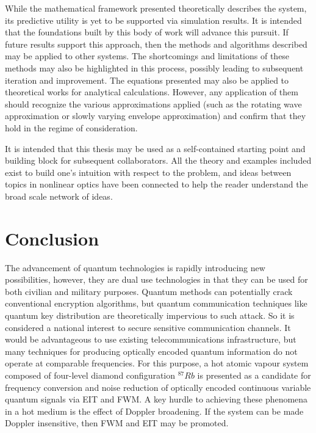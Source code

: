 \documentclass[aps,pra,showpacs,amsmath,amssymb,nofootinbib,longbibliography,superscriptaddress
]{revtex4-1}
\theoremstyle{definition}
\theoremstyle{remark}
\newcommand{\0}{\hat{0}}
\begin{document}
While the mathematical framework presented theoretically describes the system, its predictive utility is yet to be supported via simulation results. It is intended that the foundations built by this body of work will advance this pursuit. If future results support this approach, then the methods and algorithms described may be applied to other systems. The shortcomings and limitations of these methods may also be highlighted in this process, possibly leading to subsequent iteration and improvement. The equations presented may also be applied to theoretical works for analytical calculations. However, any application of them should recognize the various approximations applied (such as the rotating wave approximation or slowly varying envelope approximation) and confirm that they hold in the regime of consideration.

It is intended that this thesis may be used as a self-contained starting point and building block for subsequent collaborators. All the theory and examples included exist to build one's intuition with respect to the problem, and ideas between topics in nonlinear optics have been connected to help the reader understand the broad scale network of ideas.

\section{Conclusion}\label{Conclusion}

The advancement of quantum technologies is rapidly introducing new possibilities, however, they are dual use technologies in that they can be used for both civilian and military purposes. Quantum methods can potentially crack conventional encryption algorithms, but quantum communication techniques like quantum key distribution are theoretically impervious to such attack. So it is considered a national interest to secure sensitive communication channels. It would be advantageous to use existing telecommunications infrastructure, but many techniques for producing optically encoded quantum information do not operate at comparable frequencies. For this purpose, a hot atomic vapour system composed of four-level diamond configuration $^{87}Rb$ is presented as a candidate for frequency conversion and noise reduction of optically encoded continuous variable quantum signals via EIT and FWM. A key hurdle to achieving these phenomena in a hot medium is the effect of Doppler broadening. If the system can be made Doppler insensitive, then FWM and EIT may be promoted.
\end{document}
